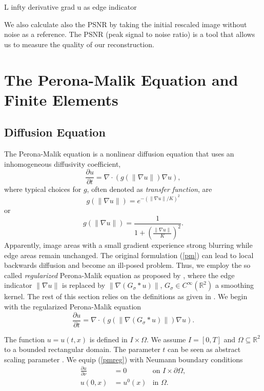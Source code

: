 \documentclass{report}
\def\ssq{\subseteq}
\def\R{\mathbb{R}}
\begin{document}
L infty
derivative
grad u as edge indicator

We also calculate also the PSNR by taking the initial rescaled image without noise as a reference. The PSNR (peak signal to noise ratio) is a tool that allows us to measure the quality of our reconstruction. 

\section{The Perona-Malik Equation and Finite Elements}

\subsection{Diffusion Equation}

The Perona-Malik equation \citep{perona1990} is a nonlinear diffusion equation that uses an inhomogeneous diffusivity coefficient,
\begin{equation} \label{pm}
	\frac{\partial u}{\partial t} = \nabla \cdot \left( g(\|\nabla u\|) \nabla u \right),
\end{equation}
where typical choices for $g$, often denoted as \emph{transfer function}, are
\begin{equation}
	g(\|\nabla u\|) = e^{-(\|\nabla u\|/K)^2}
\end{equation}
or
\begin{equation}
	g(\|\nabla u\|) = \frac{1}{1 + \left( \frac{\|\nabla u\|}{K}\right)^2}.
\end{equation}
Apparently, image areas with a small gradient experience strong blurring while edge areas remain unchanged. The original formulation (\ref{pm}) can lead to local backwards diffusion and become an ill-posed problem. Thus, we employ the so called \emph{regularized} Perona-Malik equation as proposed by \cite{catte1992}, where the edge indicator $\|\nabla u\|$ is replaced by $\|\nabla (G_\sigma \ast u)\|$, $G_\sigma \in C^\infty(\R^2)$ a smoothing kernel. The rest of this section relies on the definitions as given in \cite{handlovicova2002}. We begin with the regularized Perona-Malik equation
\begin{equation} \label{pmreg}
    \frac{\partial u}{\partial t} = \nabla \cdot \left( g\left(\left\|\nabla (G_{\sigma} \ast u)\right\|\right) \nabla u \right).
\end{equation}

The function $u = u(t,x)$ is defined in $I \times \Omega$. We assume $I = [0, T]$ and $\Omega \ssq \R^2$ to a bounded rectangular domain. The parameter $t$ can be seen as abstract scaling parameter \citep[p. 219]{handlovicova2002}. We equip (\ref{pmreg}) with Neumann boundary conditions
\begin{align}
	\frac{\partial u}{\partial \nu} &= 0 & \text{on } I \times \partial \Omega, \\
	u(0,x) &= {u^0}(x) & \text{in } \Omega.
\end{align}
\end{document}
